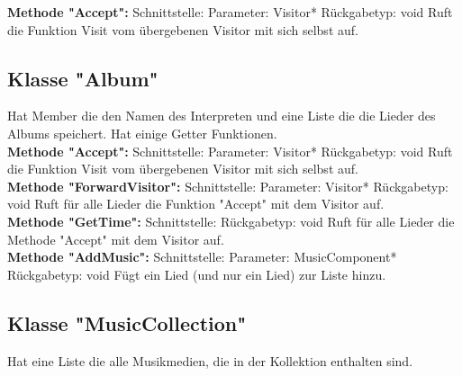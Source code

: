 \documentclass[12pt,a4paper]{article}
\begin{document}
\textbf {Methode "Accept": } 
\newline
Schnittstelle: 
\newline
Parameter: Visitor*
\newline
Rückgabetyp: void
\newline
Ruft die Funktion Visit vom übergebenen Visitor mit sich selbst auf.
\\

\subsection {Klasse "Album"}
Hat Member die den Namen des Interpreten und eine Liste die die Lieder des Albums speichert. Hat einige Getter Funktionen.
\\

\textbf {Methode "Accept": } 
\newline
Schnittstelle: 
\newline
Parameter: Visitor*
\newline
Rückgabetyp: void
\newline
Ruft die Funktion Visit vom übergebenen Visitor mit sich selbst auf.
\\

\textbf {Methode "ForwardVisitor": } 
\newline
Schnittstelle:
\newline
Parameter: Visitor*
\newline
Rückgabetyp: void
\newline
Ruft für alle Lieder die Funktion "Accept" mit dem Visitor auf.
\\

\textbf {Methode "GetTime": } 
\newline
Schnittstelle:
\newline
Rückgabetyp: void
\newline
Ruft für alle Lieder die Methode "Accept" mit dem Visitor auf.
\\

\textbf {Methode "AddMusic": } 
\newline
Schnittstelle:
\newline
Parameter: MusicComponent*
\newline
Rückgabetyp: void
\newline
Fügt ein Lied (und nur ein Lied) zur Liste hinzu.
\\

\subsection {Klasse "MusicCollection"}
Hat eine Liste die alle Musikmedien, die in der Kollektion enthalten sind.
\\
\end{document}
